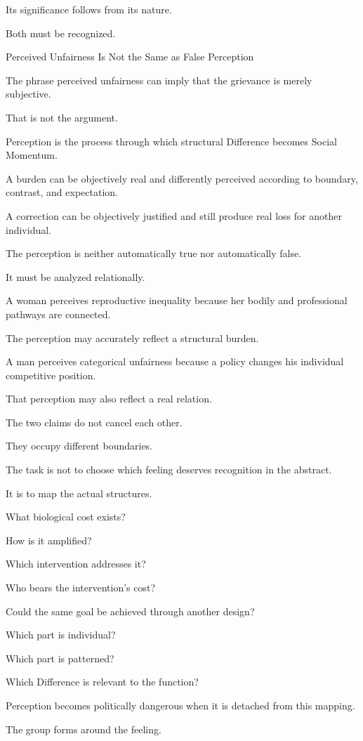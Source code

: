 Its significance follows from its nature.

Both must be recognized.

Perceived Unfairness Is Not the Same as False Perception

The phrase perceived unfairness can imply that the grievance is merely subjective.

That is not the argument.

Perception is the process through which structural Difference becomes Social Momentum.

A burden can be objectively real and differently perceived according to boundary, contrast, and expectation.

A correction can be objectively justified and still produce real loss for another individual.

The perception is neither automatically true nor automatically false.

It must be analyzed relationally.

A woman perceives reproductive inequality because her bodily and professional pathways are connected.

The perception may accurately reflect a structural burden.

A man perceives categorical unfairness because a policy changes his individual competitive position.

That perception may also reflect a real relation.

The two claims do not cancel each other.

They occupy different boundaries.

The task is not to choose which feeling deserves recognition in the abstract.

It is to map the actual structures.

What biological cost exists?

How is it amplified?

Which intervention addresses it?

Who bears the intervention’s cost?

Could the same goal be achieved through another design?

Which part is individual?

Which part is patterned?

Which Difference is relevant to the function?

Perception becomes politically dangerous when it is detached from this mapping.

The group forms around the feeling.

